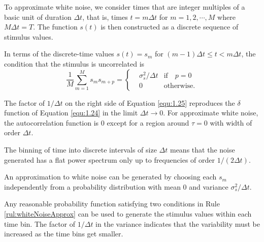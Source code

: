 \begin{ntn}
  To approximate white noise, we consider times that are integer multiples of a basic unit of duration $\Delta{t}$, that is, times $t = m \Delta{t}$ for $m = 1, 2, \cdots, M$ where $M\Delta{t} = T$. The function $s(t)$ is then constructed as a discrete sequence of stimulus values.
\end{ntn}

\begin{prop}
  \label{prop:disc-uncor-conds}
  In terms of the discrete-time values $s(t) = s_m$ for $(m-1)\Delta t \leq t < m\Delta t$, the condition that the stimulus is uncorrelated is
  \begin{equation}
    \label{equ:1.25}
    \frac{1}{M} \sum_{m=1}^M s_ms_{m+p} = \left\{
      \begin{aligned}
        &\sigma_s^2/\Delta{t}  & \text{if} \quad p=0\ \\
        &0   &\text{otherwise}.
      \end{aligned}
    \right.
  \end{equation}  
\end{prop}

\begin{rem}
  The factor of $1/\Delta{t}$ on the right side of Equation \ref{equ:1.25} reproduces the $\delta$ function of Equation \ref{equ:1.24} in the limit $\Delta{t} \rightarrow 0$. For approximate white noise, the autocorrelation function is 0 except for a region around $\tau=0$ with width of order $\Delta{t}$.
\end{rem}
\begin{exc}
  The binning of time into discrete intervals of size $\Delta t$ means that the noise generated has a flat power spectrum only up to frequencies of order $1/(2\Delta t)$.
\end{exc}

\begin{alg}
  \label{rul:whiteNoiseApprox}
  An approximation to white noise can be generated by choosing each $s_m$ independently from a probability distribution with mean $0$ and variance $\sigma_s^2 / \Delta{t}$.
\end{alg}
\begin{rem}
  Any reasonable probability function satisfying two conditions in Rule \ref{rul:whiteNoiseApprox} can be used to generate the stimulus values within each time bin. The factor of $1/\Delta{t}$ in the variance indicates that the variability must be increased as the time bins get smaller.
\end{rem}


